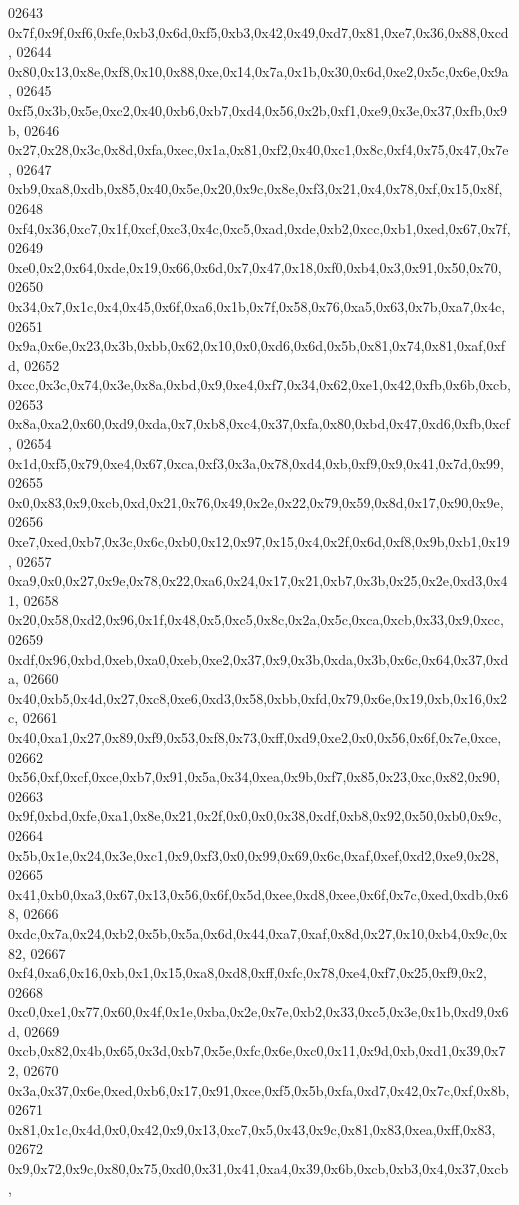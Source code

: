 \begin{DoxyCode}
02643   0x7f,0x9f,0xf6,0xfe,0xb3,0x6d,0xf5,0xb3,0x42,0x49,0xd7,0x81,0xe7,0x36,0x88,0xcd,
02644   0x80,0x13,0x8e,0xf8,0x10,0x88,0xe,0x14,0x7a,0x1b,0x30,0x6d,0xe2,0x5c,0x6e,0x9a,
02645   0xf5,0x3b,0x5e,0xc2,0x40,0xb6,0xb7,0xd4,0x56,0x2b,0xf1,0xe9,0x3e,0x37,0xfb,0x9b,
02646   0x27,0x28,0x3c,0x8d,0xfa,0xec,0x1a,0x81,0xf2,0x40,0xc1,0x8c,0xf4,0x75,0x47,0x7e,
02647   0xb9,0xa8,0xdb,0x85,0x40,0x5e,0x20,0x9c,0x8e,0xf3,0x21,0x4,0x78,0xf,0x15,0x8f,
02648   0xf4,0x36,0xc7,0x1f,0xcf,0xc3,0x4c,0xc5,0xad,0xde,0xb2,0xcc,0xb1,0xed,0x67,0x7f,
02649   0xe0,0x2,0x64,0xde,0x19,0x66,0x6d,0x7,0x47,0x18,0xf0,0xb4,0x3,0x91,0x50,0x70,
02650   0x34,0x7,0x1c,0x4,0x45,0x6f,0xa6,0x1b,0x7f,0x58,0x76,0xa5,0x63,0x7b,0xa7,0x4c,
02651   0x9a,0x6e,0x23,0x3b,0xbb,0x62,0x10,0x0,0xd6,0x6d,0x5b,0x81,0x74,0x81,0xaf,0xfd,
02652   0xcc,0x3c,0x74,0x3e,0x8a,0xbd,0x9,0xe4,0xf7,0x34,0x62,0xe1,0x42,0xfb,0x6b,0xcb,
02653   0x8a,0xa2,0x60,0xd9,0xda,0x7,0xb8,0xc4,0x37,0xfa,0x80,0xbd,0x47,0xd6,0xfb,0xcf,
02654   0x1d,0xf5,0x79,0xe4,0x67,0xca,0xf3,0x3a,0x78,0xd4,0xb,0xf9,0x9,0x41,0x7d,0x99,
02655   0x0,0x83,0x9,0xcb,0xd,0x21,0x76,0x49,0x2e,0x22,0x79,0x59,0x8d,0x17,0x90,0x9e,
02656   0xe7,0xed,0xb7,0x3c,0x6c,0xb0,0x12,0x97,0x15,0x4,0x2f,0x6d,0xf8,0x9b,0xb1,0x19,
02657   0xa9,0x0,0x27,0x9e,0x78,0x22,0xa6,0x24,0x17,0x21,0xb7,0x3b,0x25,0x2e,0xd3,0x41,
02658   0x20,0x58,0xd2,0x96,0x1f,0x48,0x5,0xc5,0x8c,0x2a,0x5c,0xca,0xcb,0x33,0x9,0xcc,
02659   0xdf,0x96,0xbd,0xeb,0xa0,0xeb,0xe2,0x37,0x9,0x3b,0xda,0x3b,0x6c,0x64,0x37,0xda,
02660   0x40,0xb5,0x4d,0x27,0xc8,0xe6,0xd3,0x58,0xbb,0xfd,0x79,0x6e,0x19,0xb,0x16,0x2c,
02661   0x40,0xa1,0x27,0x89,0xf9,0x53,0xf8,0x73,0xff,0xd9,0xe2,0x0,0x56,0x6f,0x7e,0xce,
02662   0x56,0xf,0xcf,0xce,0xb7,0x91,0x5a,0x34,0xea,0x9b,0xf7,0x85,0x23,0xc,0x82,0x90,
02663   0x9f,0xbd,0xfe,0xa1,0x8e,0x21,0x2f,0x0,0x0,0x38,0xdf,0xb8,0x92,0x50,0xb0,0x9c,
02664   0x5b,0x1e,0x24,0x3e,0xc1,0x9,0xf3,0x0,0x99,0x69,0x6c,0xaf,0xef,0xd2,0xe9,0x28,
02665   0x41,0xb0,0xa3,0x67,0x13,0x56,0x6f,0x5d,0xee,0xd8,0xee,0x6f,0x7c,0xed,0xdb,0x68,
02666   0xdc,0x7a,0x24,0xb2,0x5b,0x5a,0x6d,0x44,0xa7,0xaf,0x8d,0x27,0x10,0xb4,0x9c,0x82,
02667   0xf4,0xa6,0x16,0xb,0x1,0x15,0xa8,0xd8,0xff,0xfc,0x78,0xe4,0xf7,0x25,0xf9,0x2,
02668   0xc0,0xe1,0x77,0x60,0x4f,0x1e,0xba,0x2e,0x7e,0xb2,0x33,0xc5,0x3e,0x1b,0xd9,0x6d,
02669   0xcb,0x82,0x4b,0x65,0x3d,0xb7,0x5e,0xfc,0x6e,0xc0,0x11,0x9d,0xb,0xd1,0x39,0x72,
02670   0x3a,0x37,0x6e,0xed,0xb6,0x17,0x91,0xce,0xf5,0x5b,0xfa,0xd7,0x42,0x7c,0xf,0x8b,
02671   0x81,0x1c,0x4d,0x0,0x42,0x9,0x13,0xc7,0x5,0x43,0x9c,0x81,0x83,0xea,0xff,0x83,
02672   0x9,0x72,0x9c,0x80,0x75,0xd0,0x31,0x41,0xa4,0x39,0x6b,0xcb,0xb3,0x4,0x37,0xcb,

\end{DoxyCode}
